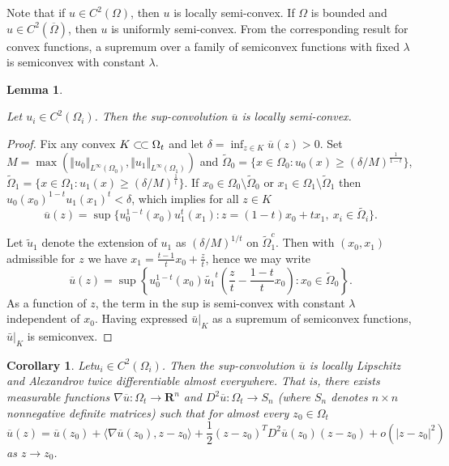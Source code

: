 \documentclass[12pt]{amsart}
\newtheorem{lem}[thm]{Lemma}
\newtheorem{cor}[thm]{Corollary}
\theoremstyle{definition}
\theoremstyle{remark}
\begin{document}
Note that if \(u \in C^2(\Omega)\), then \(u\) is locally semi-convex. If \(\Omega\) is
bounded and \(u \in C^2(\overline{\Omega})\), then \(u\) is
uniformly semi-convex. From the corresponding result for convex
functions, a supremum over a family of semiconvex functions with fixed $\lambda$ is
semiconvex with constant $\lambda$.

\begin{lem}
  \label{org15f8af8}

Let \(u_i \in C^2(\Omega_i)\). Then the sup-convolution \(\overline{u}\) is locally semi-convex.
\end{lem}
\begin{proof} Fix any convex $K \subset\joinrel\subset \Omega_t$ and let $\delta = \inf_{z \in
K}\overline{u}(z) > 0$. Set $M = \max{(\Vert u_0 \Vert_{L^\infty(\Omega_0)},\Vert u_1
\Vert_{L^\infty(\Omega_1)})}$ and $\tilde{\Omega}_0 = \{x \in \Omega_0 : u_{0}(x) \geq (\delta/M)^{\frac{1}{1-t}}\}$,
$\tilde{\Omega}_1= \{x \in \Omega_1 : u_{1}(x) \geq (\delta/M)^{\frac{1}{t}}\}$. If $x_0 \in \Omega_0 \setminus \tilde{\Omega}_0$ or
$x_1 \in \Omega_1 \setminus \tilde{\Omega}_1$ then $u_0(x_{0})^{1-t}u_1(x_{1})^{t} < \delta$, which implies
for all $z \in K$
  \[\overline{u}(z) = \sup\{u_0^{1-t}(x_0)u_1^t(x_1) : z = (1-t)x_0 + tx_1, \>
x_i \in \tilde{\Omega_i}\}.  \]

  Let $\tilde{u}_1$ denote the extension of $u_1$ as $(\delta/M)^{1/t}$ on
$\tilde{\Omega}_1^c$. Then with \((x_0, x_1)\) admissible for
\(z\) we have \(x_1 = \frac{t-1}{t} x_0 + \frac{z}{t}\), hence we may write
  \[ \overline{u}(z) =
\sup\left\{u_0^{1-t}(x_0)\tilde{u_1}^t\left(\frac{z}{t}-\frac{1-t}{t}x_0 \right)
: x_0 \in \tilde{\Omega}_0\right\}.\] As a function of \(z\), the term in the sup is semi-convex with constant \(\lambda\) independent of \(x_{0}\). Having expressed $\bar{u}|_{K}$ as a supremum of semiconvex functions, $\bar{u}|_{K}$ is semiconvex.
\end{proof}

\begin{cor}
  \label{org60a33f1} Let\(u_i \in C^2(\Omega_i)\). Then the sup-convolution \(\overline{u}\) is locally Lipschitz
and Alexandrov twice differentiable almost everywhere. That is, there exists
measurable functions \(\nabla \overline{u} : \Omega_t \to \mathbf{R}^n\) and \(D^2 \overline{u} : \Omega_t
\to S_n\) (where \(S_n\) denotes \(n\times n\) nonnegative definite matrices) such that for almost
every \(z_0 \in \Omega_t\)
  \[ \overline{u}(z) = \overline{u}(z_0) + \langle \nabla \overline{u} (z_0), z-z_0\rangle +
\frac{1}{2} (z-z_0)^T D^2 \overline{u} (z_0) (z-z_0) + o (|z-z_0|^2)
  \] as \(z \to z_0\).
\end{cor}
\end{document}
